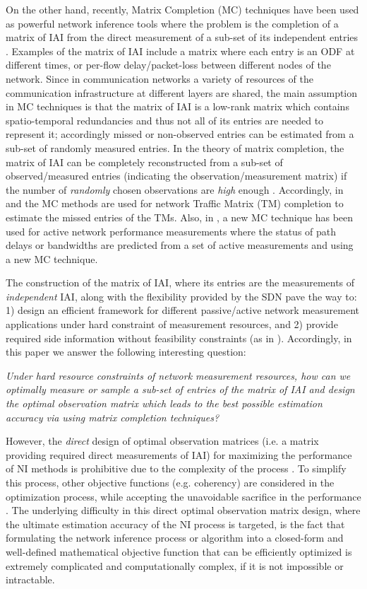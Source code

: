 On the other hand, recently, Matrix Completion (MC) techniques have been used as powerful network inference tools where the problem is the completion of a matrix of IAI from the direct measurement of a sub-set of its independent entries \cite{Roughan:2012}\cite{Gursun:2011}\cite{YLiao:2011}. Examples of the matrix of IAI include a matrix where each entry is an ODF at different times, or per-flow delay/packet-loss between different nodes of the network. Since in communication networks a variety of resources of the communication infrastructure at different layers are shared, the main assumption in MC techniques is that the matrix of IAI is a low-rank matrix which contains spatio-temporal redundancies and thus not all of its entries are needed to represent it; accordingly missed or non-observed entries can be estimated from a sub-set of randomly measured entries. In the theory of matrix completion, the matrix of IAI can be completely reconstructed from a sub-set of observed/measured entries (indicating the observation/measurement matrix) if the number of \emph{randomly} chosen observations are \emph{high} enough \cite{Candes:2009}\cite{Candes:2010}. Accordingly, in \cite{Roughan:2012} and \cite{Gursun:2011} the MC methods are used for network Traffic Matrix (TM) completion to estimate the missed entries of the TMs. Also, in \cite{YLiao:2011}, a new MC technique has been used for active network performance measurements where the status of path delays or bandwidths are predicted from a set of active measurements and using a new MC technique.

The construction of the matrix of IAI, where its entries are the measurements of \emph{independent} IAI, along with the flexibility provided by the SDN pave the way to: 1) design an efficient framework for different passive/active network measurement applications under hard constraint of measurement resources, and 2) provide required side information without feasibility constraints (as in \cite{IF14iSTAMP:2014}). Accordingly, in this paper we answer the following interesting question:

\emph{Under hard resource constraints of network measurement resources, how can we optimally measure or sample a sub-set of entries of the matrix of IAI and design the optimal observation matrix which leads to the best possible estimation accuracy via using matrix completion techniques?}

However, the \emph{direct} design of optimal observation matrices (i.e. a matrix providing required direct measurements of IAI) for maximizing the performance of NI methods is prohibitive due to the complexity of the process \cite{IF14iSTAMP:2014}\cite{Elad:2007}. To simplify this process, other objective functions (e.g. coherency) are considered in the optimization process, while accepting the unavoidable sacrifice in the performance \cite{Elad:2007}\cite{IF14iSTAMP:2014}. The underlying difficulty in this direct optimal observation matrix design, where the ultimate estimation accuracy of the NI process is targeted, is the fact that formulating the network inference process or algorithm into a closed-form and well-defined mathematical objective function that can be efficiently optimized is extremely complicated and computationally complex, if it is not impossible or intractable.


